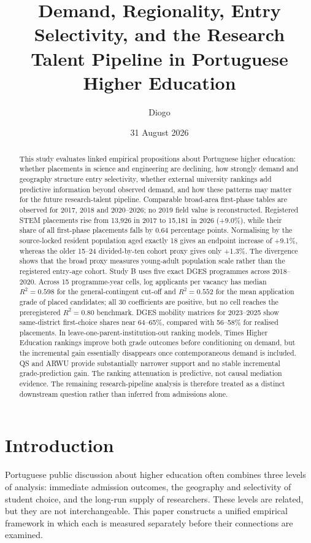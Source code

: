 \documentclass[11pt,a4paper]{article}
\title{Demand, Regionality, Entry Selectivity, and the Research Talent Pipeline in Portuguese Higher Education}
\author{Diogo}
\date{31 August 2026}
\begin{document}
\maketitle

\begin{abstract}
This study evaluates linked empirical propositions about Portuguese higher education: whether placements in science and engineering are declining, how strongly demand and geography structure entry selectivity, whether external university rankings add predictive information beyond observed demand, and how these patterns may matter for the future research-talent pipeline. Comparable broad-area first-phase tables are observed for 2017, 2018 and 2020--2026; no 2019 field value is reconstructed. Registered STEM placements rise from 13,926 in 2017 to 15,181 in 2026 (+9.0\%), while their share of all first-phase placements falls by 0.64 percentage points. Normalising by the source-locked resident population aged exactly 18 gives an endpoint increase of +9.1\%, whereas the older 15--24 divided-by-ten cohort proxy gives only +1.3\%. The divergence shows that the broad proxy measures young-adult population scale rather than the registered entry-age cohort. Study B uses five exact DGES programmes across 2018--2020. Across 15 programme-year cells, log applicants per vacancy has median $R^2=0.598$ for the general-contingent cut-off and $R^2=0.552$ for the mean application grade of placed candidates; all 30 coefficients are positive, but no cell reaches the preregistered $R^2=0.80$ benchmark. DGES mobility matrices for 2023--2025 show same-district first-choice shares near 64--65\%, compared with 56--58\% for realised placements. In leave-one-parent-institution-out ranking models, Times Higher Education rankings improve both grade outcomes before conditioning on demand, but the incremental gain essentially disappears once contemporaneous demand is included. QS and ARWU provide substantially narrower support and no stable incremental grade-prediction gain. The ranking attenuation is predictive, not causal mediation evidence. The remaining research-pipeline analysis is therefore treated as a distinct downstream question rather than inferred from admissions alone.
\end{abstract}

\section{Introduction}
Portuguese public discussion about higher education often combines three levels of analysis: immediate admission outcomes, the geography and selectivity of student choice, and the long-run supply of researchers. These levels are related, but they are not interchangeable. This paper constructs a unified empirical framework in which each is measured separately before their connections are examined.
\end{document}

